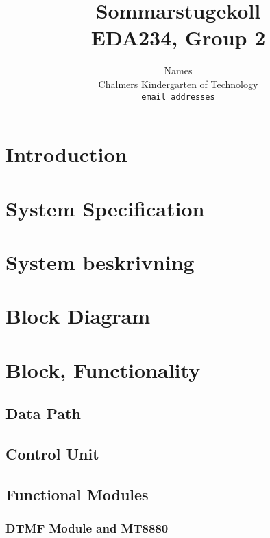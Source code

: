 \documentclass[a4paper,11pt]{article}
\begin{document}
\title{Sommarstugekoll \\
	EDA234, Group 2}
\author{Names \\
   Chalmers Kindergarten of Technology \\
   \texttt{email addresses}}

\maketitle

\begin{abstract}
\end{abstract}

\pagebreak

\tableofcontents

\section{Introduction}

\section{System Specification}

\section{System beskrivning}

\section{Block Diagram}

\section{Block, Functionality}

	\subsection{Data Path}

	\subsection{Control Unit}

	\subsection{Functional Modules}

		\subsubsection{DTMF Module and MT8880}
	
\end{document}
